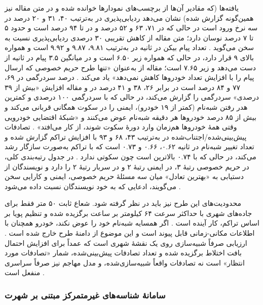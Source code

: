 \documentclass[12pt,a4paper]{article}
\begin{document}
یافته‌ها (که مقادیر آن‌ها از برچسب‌های نمودار‌ها خوانده شده و در متن مقاله نیز همین‌گونه گزارش شده) نشان می‌دهد ردیابی‌پذیری در  به‌ترتیب ۴۰، ۳۱ و ۲۰ درصد در سه نرخ ورود است در حالی که در  ۷۱، ۶۳ و ۵۲ درصد و در  تا ۹۴ درصد است و  حدود ۵ تا ۷ درصد نوسان دارد؛ متن مقاله از کاهش تقریبی ۳۰ درصدی ردیابی‌پذیری نسبت به  سخن می‌گوید \cite{al-aniPrivacySafetyImprovement2023}. تعداد پیام بیکن در ثانیه در  به‌ترتیب ۹.۸۱، ۹.۸۷ و ۹.۹۲ است و همواره بالای ۹ قرار دارد، در حالی که  همواره زیر ۶.۵۰ است و در میانگین ۳.۵ پیام در ثانیه از دست می‌دهد و  زیر ۷.۶۵ است؛ مقاله از  به‌عنوان «تنها طرح حریم خصوصی که ارسال پیام را با افزایش تعداد خودرو‌ها کاهش نمی‌دهد» یاد می‌کند \cite{al-aniPrivacySafetyImprovement2023}. درصد سردرگمی در  ۶۹، ۷۷ و ۸۴ درصد است در برابر ۲۶، ۳۸ و ۴۱ درصد در  و مقاله افزایش «بیش از ۳۹ درصدی» سردرگمی را گزارش می‌کند، در حالی که  با سردرگمی ۱۰۰ درصدی و کمترین هدر رفتن شبه‌نام (کمتر از ۱۹ خودرو)، ایمنی را در سکوت همگانی قربانی می‌کند و بیش از ۸۵ درصد خودرو‌ها هر دقیقه شبه‌نام عوض می‌کنند و «شبکهٔ اقتضایی خودرویی وقتی همهٔ خودرو‌ها هم‌زمان وارد دورهٔ سکوت شوند، از کار می‌افتد» \cite{al-aniPrivacySafetyImprovement2023}. تصادفات پیش‌بینی‌شده/اجتناب‌شده در  به‌ترتیب ۴۳، ۶۸ و ۹۳ با افزایش تراکم گزارش شده و تعداد تغییر شبه‌نام در ثانیه ۰.۶۲، ۰.۶۶ و ۰.۷۳ است که با تراکم به‌صورت سازگار رشد می‌کند، در حالی که  با ۰.۷۴ بالاترین است چون سکوتی ندارد \cite{al-aniPrivacySafetyImprovement2023}. در جدول رتبه‌بندی کلی،  در حریم خصوصی رتبهٔ ۳، در ایمنی رتبهٔ ۲ و در سربار رتبهٔ ۲ را دارد و نویسندگان از دستیابی به «بهترین تعادل» میان سه مسئلهٔ حریم خصوصی، ایمنی و کارایی سخن می‌گویند، ادعایی که به خود نویسندگان نسبت داده می‌شود \cite{al-aniPrivacySafetyImprovement2023}.

محدودیت‌های این طرح نیز باید در نظر گرفته شود. شعاع ثابت ۵۰ متر فقط برای جاده‌های شهری با حداکثر سرعت ۶۴ کیلومتر بر ساعت برگزیده شده و تنظیم پویا بر اساس تراکم، کار آینده است \cite{al-aniPrivacySafetyImprovement2023}. اگر همسایه شبه‌نام خود را عوض نکند، خودرو همچنان با اطلاعات مکانی-زمانی قابل پیوند است و این موضوع از دامنهٔ طرح خارج شده است \cite{al-aniPrivacySafetyImprovement2023}. ارزیابی صرفاً شبیه‌سازی روی یک نقشهٔ شهری است که عمداً برای افزایش احتمال بافت اختلاط برگزیده شده و تعداد تصادفات پیش‌بینی‌شده، شمار «تصادفات مورد انتظار» است نه تصادفات واقعاً شبیه‌سازی‌شده، و مدل مهاجم نیز صرفاً سراسری منفعل است \cite{al-aniPrivacySafetyImprovement2023}.

\subsubsection{سامانهٔ شناسه‌های غیرمتمرکز مبتنی بر شهرت }
\end{document}

